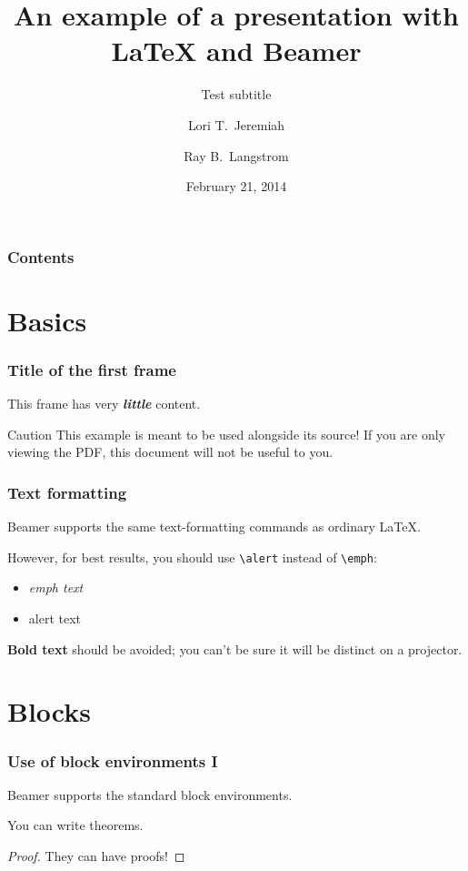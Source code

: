 \documentclass{beamer}
\title[Example presentation]{An example of a presentation with \LaTeX{} and Beamer}
\subtitle[Test]{Test subtitle}
\author[Jeremiah \and Langstrom]{Lori T.~Jeremiah \and Ray B.~Langstrom}
\date{February 21, 2014}
\begin{document}
\begin{frame}
  \titlepage
\end{frame}

\begin{frame}
  \frametitle{Contents}
  \toc
\end{frame}

\section{Basics}
\begin{frame}
  \frametitle{Title of the first frame}
  This frame has very \textit{\textbf{little}} content.

  \begin{alertblock}{Caution}
    This example is meant to be used alongside its source!
    If you are only viewing the PDF, this document will not be useful to you.
  \end{alertblock}
\end{frame}

\begin{frame}[fragile] %
  \frametitle{Text formatting}
  Beamer supports the same text-formatting commands as ordinary \LaTeX{}.

  However, for best results, you should use \verb|\alert| instead of \verb|\emph|:

  \begin{itemize}
  \item \emph{emph text}
  \item \alert{alert text}
  \end{itemize}

  \textbf{Bold text} should be avoided; you can't be sure it will be distinct on a projector.
\end{frame}

\section{Blocks}
\begin{frame}
  \frametitle{Use of block environments I}
  Beamer supports the standard block environments.

  \begin{theorem}
    You can write theorems.
  \end{theorem}

  \begin{proof}
    They can have proofs!
  \end{proof}
\end{frame}
\end{document}
